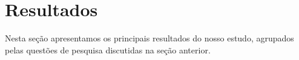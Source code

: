 \section{Resultados}\label{sec:resultados}

Nesta se\c c\~{a}o apresentamos os principais resultados do nosso
estudo, agrupados pelas quest\~{o}es de pesquisa discutidas na se\c
c\~{a}o anterior. 







